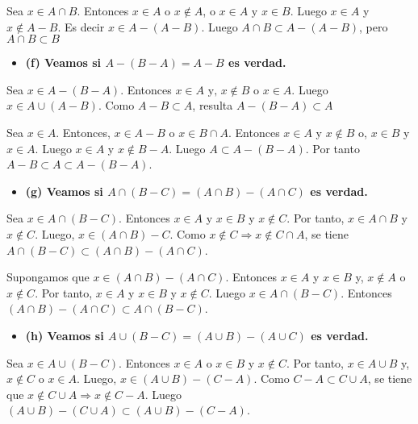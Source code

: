 \documentclass{article}
\begin{document}
Sea $x\in A\cap B$. Entonces $x\in A\text{ o } x\notin A$, o $x\in A\text{ y } x\in B$. Luego $x\in A$ y $x\notin A-B$. Es decir $x\in A-(A-B)$. Luego $A\cap B\subset A-(A-B)$, pero $A\cap B\subset B$
\begin{itemize}
\item \bf (f) \rm Veamos si  $A-(B-A)=A-B$ es verdad.
\end{itemize}
Sea $x\in A-(B-A)$. Entonces $x\in A\text{ y, }x\notin B \text{ o } x \in A$. Luego $x\in  A\cup (A-B)$. Como $A-B\subset A$, resulta $A-(B-A)\subset A$

Sea $x\in A$. Entonces, $x\in A-B$ o $x\in B\cap A$. Entonces $x\in A$ y $x\notin B$ o, $x\in B$ y $x\in A$. Luego $x\in A$ y $x\notin B-A$. Luego $A\subset A-(B-A)$. Por tanto $A-B\subset A\subset A-(B-A)$.
\begin{itemize}
\item \bf (g) \rm Veamos si  $A\cap(B-C)=(A\cap B)-(A\cap C)$ es verdad.
\end{itemize}
Sea $x\in A\cap (B-C)$. Entonces $x\in A$ y $x\in B$ y $x\notin C$. Por tanto, $x\in A\cap B$ y $x\notin C$. Luego, $x\in (A\cap B)-C$. Como $x\notin C\Rightarrow x\notin C\cap A$, se tiene $A\cap (B-C)\subset (A\cap B)-(A\cap C)$.

Supongamos que $x\in (A\cap B)-(A\cap C)$. Entonces $x\in A$ y $x\in B$ y, $x\notin A$ o $x\notin C$. Por tanto, $x\in A$ y $x\in B$ y $x\notin C$. Luego $x\in A\cap (B-C)$. Entonces $(A\cap B)-(A\cap C)\subset A\cap (B-C)$.
\begin{itemize}
\item \bf (h) \rm Veamos si  $A\cup(B-C)=(A\cup B)-(A\cup C)$ es verdad.
\end{itemize}
Sea $x\in A\cup (B-C)$. Entonces $x\in A$ o $x\in B$ y $x\notin C$. Por tanto, $x\in A\cup B$ y, $x\notin C$ o $x\in A$. Luego, $x\in (A\cup B)-(C-A)$. Como $C-A\subset C\cup A$, se tiene que $x\notin C\cup A\Rightarrow x\notin C-A$. Luego $(A\cup B)-(C\cup A)\subset (A\cup B)-(C-A)$.
\end{document}
